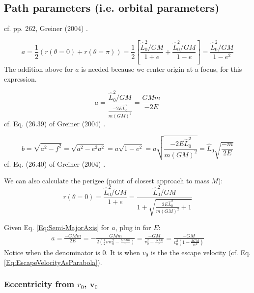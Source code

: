 \documentclass[10pt]{amsart}
\begin{document}
\begin{multicols*}{2}
\subsection{Path parameters (i.e. orbital parameters)}

cf. pp. 262, Greiner (2004) \cite{Grei2004}.

\[
a = \frac{1}{2} ( r(\theta = 0) + r(\theta = \pi) ) = \frac{1}{2} \left[ \frac{ \widehat{L}_0^2 / GM }{ 1 + e } + \frac{\widehat{L}_0^2 / GM }{ 1- e} \right] = \frac{ \widehat{L}_0^2 / GM}{ 1 - e^2 }
\]
The addition above for $a$ is needed because we center origin at a focus, for this expression. 

\begin{equation}\label{Eq:Semi-MajorAxis}
a = \frac{\widehat{L}_0^2 /GM}{ \frac{ - 2 E \widehat{L}_0^2 }{ m (GM)^2 } } = \frac{ GMm }{ - 2 E} 
\end{equation}
cf. Eq. (26.39) of Greiner (2004) \cite{Grei2004}. 

\begin{equation}
b = \sqrt{ a^2 - f^2 } = \sqrt{a^2 - e^2 a^2 } = a \sqrt{ 1 - e^2 } = a \sqrt{ \frac{ -2 E \widehat{L}_0^2 }{ m (GM)^2 } } = \widehat{L}_0 \sqrt{ \frac{ - m}{ 2E} }
\end{equation}
cf. Eq. (26.40) of Greiner (2004) \cite{Grei2004}. 

We can also calculate the perigee (point of closest approach to mass $M$):
\begin{equation}
r(\theta =0 ) = \frac{ \widehat{L}_0^2 / GM }{ 1 + e } = \frac{ \widehat{L}_0^2 / GM }{ 1 + \sqrt{ \frac{ 2 E \widehat{L}_0^2 }{ m (GM)^2 } + 1 } }
\end{equation}

Given Eq. \ref{Eq:Semi-MajorAxis} for $a$, plug in for $E$:
\begin{equation}
\begin{gathered}
a = \frac{ - GMm}{2 E} = - \frac{GMm}{ 2 \left( \frac{1}{2} m v_0^2 - \frac{GMm}{r} \right) } = \frac{ -GM }{ v_0^2 - \frac{2GM}{r} } = \frac{ - GM }{ v_0^2 \left( 1 - \frac{2 GM}{ rv^2 }\right)} 
\end{gathered}
\end{equation}
Notice when the denominator is 0. It is when $v_0$ is the the escape velocity (cf. Eq. \ref{Eq:EscapeVelocityAsParabola}). 

\subsubsection{Eccentricity from $r_0$, $\mathbf{v}_0$}


\end{multicols*}
\end{document}
